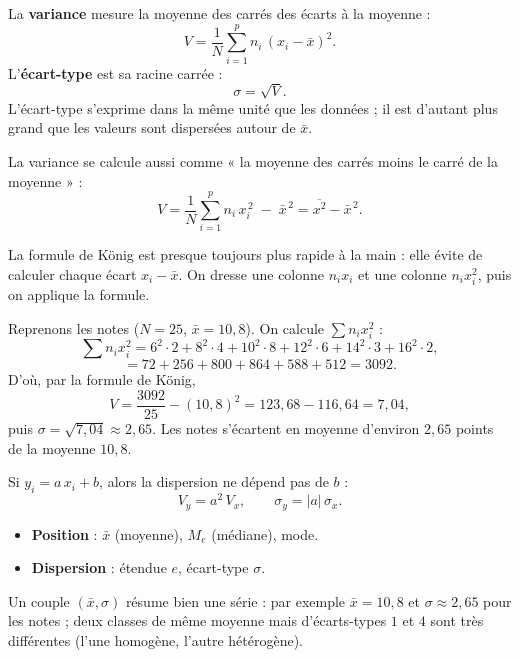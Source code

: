 \begin{definition}
La \textbf{variance} mesure la moyenne des carrés des écarts à la moyenne :
\[ V = \frac{1}{N}\sum_{i=1}^{p} n_i\,(x_i - \bar x)^2. \]
L'\textbf{écart-type} est sa racine carrée :
\[ \sigma = \sqrt{V}. \]
L'écart-type s'exprime dans la même unité que les données ; il est d'autant plus
grand que les valeurs sont dispersées autour de $\bar x$.
\end{definition}

\begin{theoreme}
La variance se calcule aussi comme « la moyenne des carrés moins le carré de la
moyenne » :
\[ V = \frac{1}{N}\sum_{i=1}^{p} n_i\,x_i^{\,2} \;-\; \bar x^{\,2}
     = \overline{x^2} - \bar x^{\,2}. \]
\end{theoreme}

\begin{remarque}
La formule de König est presque toujours plus rapide à la main : elle évite de
calculer chaque écart $x_i-\bar x$. On dresse une colonne $n_ix_i$ et une colonne
$n_ix_i^2$, puis on applique la formule.
\end{remarque}

\begin{exemple}
Reprenons les notes ($N=25$, $\bar x = 10{,}8$). On calcule $\sum n_i x_i^2$ :
\[ \sum n_i x_i^2 = 6^2\!\cdot\!2 + 8^2\!\cdot\!4 + 10^2\!\cdot\!8 + 12^2\!\cdot\!6
   + 14^2\!\cdot\!3 + 16^2\!\cdot\!2, \]
\[ = 72 + 256 + 800 + 864 + 588 + 512 = 3092. \]
D'où, par la formule de König,
\[ V = \frac{3092}{25} - (10{,}8)^2 = 123{,}68 - 116{,}64 = 7{,}04, \]
puis $\sigma = \sqrt{7{,}04} \approx 2{,}65$. Les notes s'écartent en moyenne d'environ
$2{,}65$ points de la moyenne $10{,}8$.
\end{exemple}

\begin{propriete}
Si $y_i = a\,x_i + b$, alors la dispersion ne dépend pas de $b$ :
\[ V_y = a^2\,V_x, \qquad \sigma_y = |a|\,\sigma_x. \]
\end{propriete}

\begin{aretenir}
\begin{itemize}
  \item \textbf{Position} : $\bar x$ (moyenne), $M_e$ (médiane), mode.
  \item \textbf{Dispersion} : étendue $e$, écart-type $\sigma$.
\end{itemize}
Un couple $(\bar x,\sigma)$ résume bien une série : par exemple $\bar x=10{,}8$ et
$\sigma\approx2{,}65$ pour les notes ; deux classes de même moyenne mais d'écarts-types
$1$ et $4$ sont très différentes (l'une homogène, l'autre hétérogène).
\end{aretenir}

